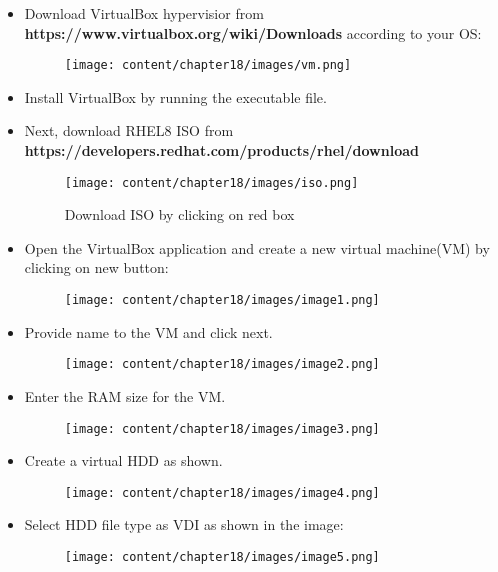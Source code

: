 \setlength{\columnsep}{3pt}
\begin{flushleft}

\begin{itemize}
	\item Download VirtualBox hypervisior from \textbf{https://www.virtualbox.org/wiki/Downloads} 
	according to your OS:
	\begin{figure}[h!]
		\centering
		\texttt{[image: content/chapter18/images/vm.png]}
	\end{figure}		

	\item Install VirtualBox by running the executable file.	
	
	\item Next, download RHEL8 ISO from \textbf{https://developers.redhat.com/products/rhel/download}
	
	\begin{figure}[h!]
		\centering
		\texttt{[image: content/chapter18/images/iso.png]}
		\caption{Download ISO by clicking on red box}
		\label{new}
	\end{figure}		

	\newpage
	\item Open the VirtualBox application and create a new virtual machine(VM) by clicking on new button:
	
	\begin{figure}[h!]
		\centering
		\texttt{[image: content/chapter18/images/image1.png]}
	\end{figure}		

	\item Provide name to the VM and click next.
	\begin{figure}[h!]
		\centering
		\texttt{[image: content/chapter18/images/image2.png]}
	\end{figure}		
	
	\item Enter the RAM size for the VM.
	\begin{figure}[h!]
		\centering
		\texttt{[image: content/chapter18/images/image3.png]}
	\end{figure}		

	\newpage
	\item Create a virtual HDD as shown.
	\begin{figure}[h!]
		\centering
		\texttt{[image: content/chapter18/images/image4.png]}
	\end{figure}		

	
	\item Select HDD file type as VDI as shown in the image:
	\begin{figure}[h!]
		\centering
		\texttt{[image: content/chapter18/images/image5.png]}
	\end{figure}		
	

\end{itemize}
\end{flushleft}
